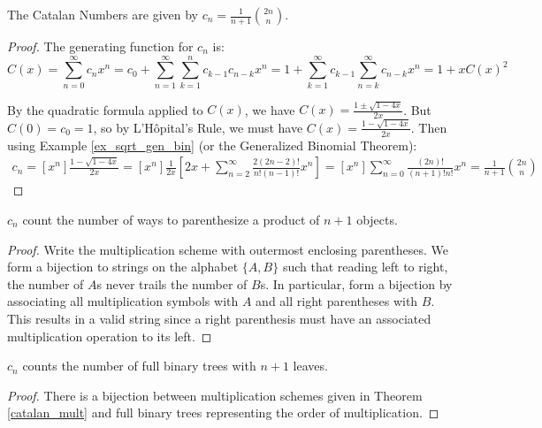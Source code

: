 \documentclass[a4paper]{article}
\begin{document}
\begin{theorem}
The Catalan Numbers are given by $c_n=\frac1{n+1}\binom{2n}n$.

\begin{hl}
\begin{proof}
The generating function for $c_n$ is:
\begin{equation*}
C(x)
=\sum_{n=0}^\infty c_nx^n
=c_0+\sum_{n=1}^\infty\sum_{k=1}^nc_{k-1}c_{n-k}x^n
=1+\sum_{k=1}^\infty c_{k-1}\sum_{n=k}^\infty c_{n-k}x^n
=1+xC(x)^2
\end{equation*}

By the quadratic formula applied to $C(x)$, we have $C(x)=\frac{1\pm\sqrt{1-4x}}{2x}$. But $C(0)=c_0=1$, so by L'H\^opital's Rule, we must have $C(x)=\frac{1-\sqrt{1-4x}}{2x}$. Then using Example \ref{ex_sqrt_gen_bin} (or the Generalized Binomial Theorem):
\begin{align*}
c_n
=[x^n]\frac{1-\sqrt{1-4x}}{2x}
=[x^n]\frac1{2x}\left[2x+\sum_{n=2}^\infty\frac{2(2n-2)!}{n!(n-1)!}x^n\right]
=[x^n]\sum_{n=0}^\infty\frac{(2n)!}{(n+1)!n!}x^n
=\frac1{n+1}\binom{2n}n
\end{align*}
\end{proof}
\end{hl}
\end{theorem}

\begin{theorem}\label{catalan_mult}
$c_n$ count the number of ways to parenthesize a product of $n+1$ objects.

\begin{hl}
\begin{proof}
Write the multiplication scheme with outermost enclosing parentheses. We form a bijection to strings on the alphabet $\{A,B\}$ such that reading left to right, the number of $A$s never trails the number of $B$s. In particular, form a bijection by associating all multiplication symbols with $A$ and all right parentheses with $B$. This results in a valid string since a right parenthesis must have an associated multiplication operation to its left.
\end{proof}
\end{hl}
\end{theorem}

\begin{corollary}
$c_n$ counts the number of full binary trees with $n+1$ leaves.

\begin{hl}
\begin{proof}
There is a bijection between multiplication schemes given in Theorem \ref{catalan_mult} and full binary trees representing the order of multiplication.
\end{proof}
\end{hl}
\end{corollary}
\end{document}
